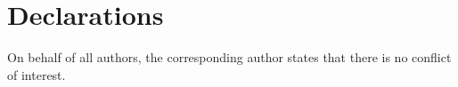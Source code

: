 \documentclass[iicol]{sn-jnl}%
\theoremstyle{thmstyleone}%
\theoremstyle{thmstyletwo}%
\theoremstyle{thmstylethree}%
\begin{document}
 




\section*{Declarations}
On behalf of all authors, the corresponding author states that there is no conflict of interest.

% 

% 

% 

\end{document}
